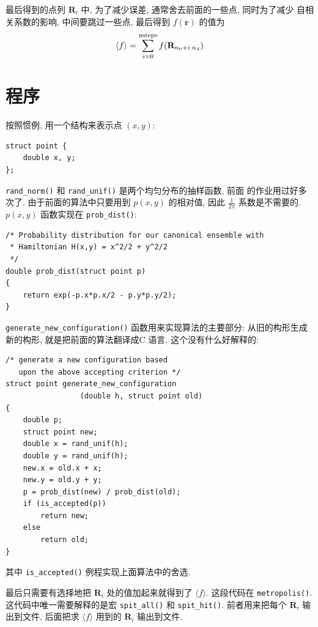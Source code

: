 \documentclass{ctexart}
\def\vec#1{\mathbf{#1}}
\begin{document}
最后得到的点列 $\vec R_i$ 中, 为了减少误差, 通常舍去前面的一些点, 同时为了减少
自相关系数的影响, 中间要跳过一些点, 最后得到 $f(\vec r)$ 的值为
\[
\langle f\rangle = \sum_{i=0}^{\rm nsteps} f(\vec R_{n_0+i\cdot n_d})
\]
\section{程序}
按照惯例, 用一个结构来表示点 $(x,y)$:
\begin{verbatim}
struct point {
    double x, y;
};
\end{verbatim}

\verb|rand_norm()| 和 \verb|rand_unif()| 是两个均匀分布的抽样函数, 前面
的作业用过好多次了. 由于前面的算法中只要用到 $p(x,y)$ 的相对值, 因此 $\frac{1}{2\pi}$
系数是不需要的. $p(x,y)$ 函数实现在 \verb|prob_dist()|:
\begin{verbatim}
/* Probability distribution for our canonical ensemble with
 * Hamiltonian H(x,y) = x^2/2 + y^2/2
 */
double prob_dist(struct point p)
{
    return exp(-p.x*p.x/2 - p.y*p.y/2);
}
\end{verbatim}

\verb|generate_new_configuration()| 函数用来实现算法的主要部分: 从旧的构形生成
新的构形, 就是把前面的算法翻译成C 语言, 这个没有什么好解释的:
\begin{verbatim}
/* generate a new configuration based
   upon the above accepting criterion */
struct point generate_new_configuration
                 (double h, struct point old)
{
    double p;
    struct point new;
    double x = rand_unif(h);
    double y = rand_unif(h);
    new.x = old.x + x;
    new.y = old.y + y;
    p = prob_dist(new) / prob_dist(old);
    if (is_accepted(p))
        return new;
    else
        return old;
}
\end{verbatim}
其中 \verb|is_accepted()| 例程实现上面算法中的舍选.

最后只需要有选择地把 $\vec R_i$ 处的值加起来就得到了 $\langle f\rangle$.
这段代码在 \verb|metropolis()|. 这代码中唯一需要解释的是宏 \verb|spit_all()|
和 \verb|spit_hit()|. 前者用来把每个 $\vec R_i$ 输出到文件, 后面把求
$\langle f\rangle$ 用到的 $\vec R_i$ 输出到文件.
\end{document}
